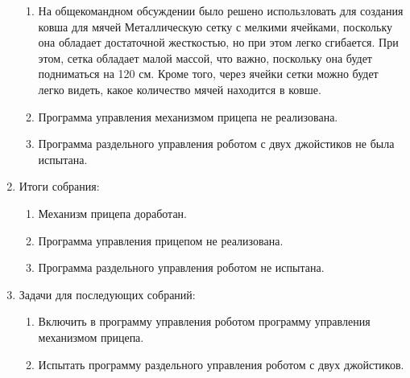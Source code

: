 \begin{enumerate}
\begin{enumerate}
		\item На общекомандном обсуждении было решено использловать для создания ковша для мячей Металлическую сетку с мелкими ячейками, поскольку она обладает достаточной жесткостью, но при этом легко сгибается. При этом, сетка обладает малой массой, что важно, поскольку она будет подниматься на 120 см. Кроме того, через ячейки сетки можно будет легко видеть, какое количество мячей находится в ковше.
		
		\item Программа управления механизмом прицепа не реализована.
		
		\item Программа раздельного управления роботом с двух джойстиков не была испытана.
		
	\end{enumerate}
	
	\item Итоги собрания:
	\begin{enumerate}
		\item Механизм прицепа доработан.
		
		\item Программа управления прицепом не реализована.
		
		\item Программа раздельного управления роботом не испытана.
		
	\end{enumerate}
	
	\item Задачи для последующих собраний:
	\begin{enumerate}
		\item Включить в программу управления роботом программу управления механизмом прицепа.
		
		\item Испытать программу раздельного управления роботом с двух джойстиков.
		
	\end{enumerate}     
\end{enumerate}
\fillpage

